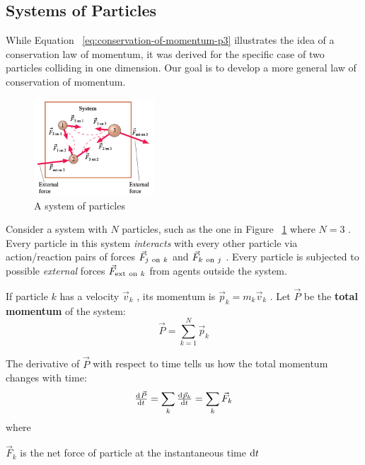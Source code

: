 \subsection{Systems of Particles} While Equation~%
\ref{eq:conservation-of-momentum-p3} illustrates the idea of a
conservation law of momentum, it was derived for the specific case of
two particles colliding in one dimension.  Our goal is to develop a more
general law of conservation of momentum.

\begin{figure}
    \centering
    \includegraphics[width=0.4\textwidth]{../figures/n-particle-system.png}
    \caption{A system of particles}%
    \label{fig:n-particle-system}
\end{figure}

Consider a system with
$
    N
$ particles, such as the one in Figure~%
\ref{fig:n-particle-system} where
$
    N=3
$%
.  Every particle in this system \emph{interacts} with every other
particle via action/reaction pairs of forces
$
    \vec{F}_{j\mathrm{~on~} k}
$ and
$
    \vec{F}_{k\mathrm{~on~} j}
$%
.  Every particle is subjected to possible \emph{external} forces
$
    \vec{F}_{\mathrm{ext}\mathrm{~on~} k}
$%
from agents outside the system.

If particle
$
    k
$ has a velocity
$
    \vec{v}_k
$%
, its momentum is
$
    \vec{p}_k = m_k \vec{v}_k
$%
.  Let
$
    \vec{P}
$ be the \textbf{total momentum} of the system:
\begin{equation}
    \vec{P} = \sum_{k=1}^{N} \vec{p}_k
\end{equation}

The derivative of
$
    \vec{P}
$ with respect to time tells us how the total momentum changes with
time:
\begin{equation}
    \label{eq:conservation-of-momentum-p4} \od{\vec{P}}{t} = \sum_k \od{\vec
    {p}_k}{t} = \sum_k \vec{F}_k
\end{equation}
where

$
    \vec{F}_k
$ is the net force of particle at the instantaneous time
$
    \dif t
$

